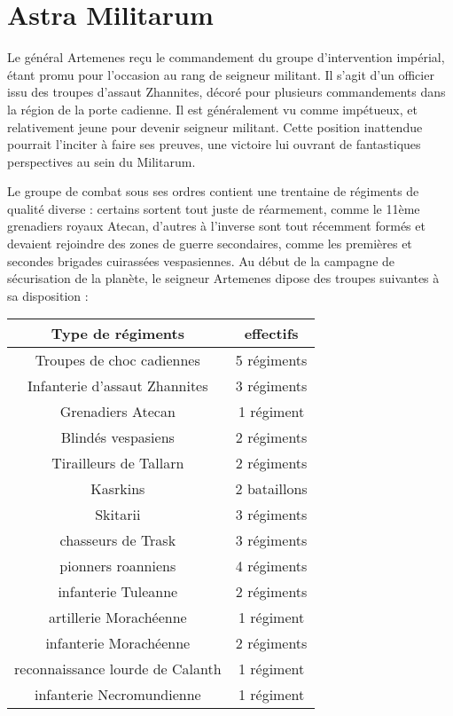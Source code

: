 \documentclass[10pt,a4paper]{book}
\begin{document}
\section{Astra Militarum}
Le général Artemenes reçu le commandement du groupe d'intervention impérial, étant promu pour l'occasion au rang de seigneur militant. Il s'agit d'un officier issu des troupes d'assaut Zhannites, décoré pour plusieurs commandements dans la région de la porte cadienne. Il est généralement vu comme impétueux, et relativement jeune pour devenir seigneur militant. Cette position inattendue pourrait l'inciter à faire ses preuves, une victoire lui ouvrant de fantastiques perspectives au sein du Militarum.

Le groupe de combat sous ses ordres contient une trentaine de régiments de qualité diverse : certains sortent tout juste de réarmement, comme le 11ème grenadiers royaux Atecan, d'autres à l'inverse sont tout récemment formés et devaient rejoindre des zones de guerre secondaires, comme les premières et secondes brigades cuirassées vespasiennes. Au début de la campagne de sécurisation de la planète, le seigneur Artemenes dipose des troupes suivantes à sa disposition :
\begin{center}
\begin{tabular}{c|c}
Type de régiments & effectifs \\ \hline
Troupes de choc cadiennes & 5 régiments\\
Infanterie d'assaut Zhannites & 3 régiments\\ %
Grenadiers Atecan & 1 régiment \\
Blindés vespasiens & 2 régiments \\
Tirailleurs de Tallarn & 2 régiments \\ %
Kasrkins & 2 bataillons\\
Skitarii & 3 régiments \\
chasseurs de Trask & 3 régiments \\
pionners roanniens & 4 régiments \\%
infanterie Tuleanne  & 2 régiments\\
artillerie Morachéenne & 1 régiment\\
infanterie Morachéenne & 2 régiments \\
reconnaissance lourde de Calanth & 1 régiment\\
infanterie Necromundienne & 1 régiment
\end{tabular}
\end{center}
\end{document}
